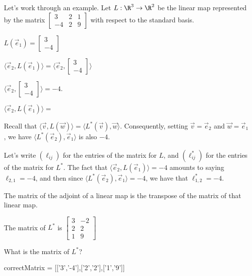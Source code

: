 \documentclass{ximera}
\begin{document}
\begin{question}
  Let's work through an example.  Let $L:\R^3 \to \R^2$ be the linear
  map represented by the matrix \(\begin{bmatrix} 3&2 &1\\
    -4&2&9\end{bmatrix}\) with respect to the standard basis.

  \begin{solution}
    \begin{hint}
      $L(\vec{e}_1) = \begin{bmatrix} 3 \\ -4 \end{bmatrix}$
    \end{hint}
    \begin{hint}
      $\langle \vec{e}_2, L(\vec{e}_1) \rangle = \langle \vec{e}_2, \begin{bmatrix} 3 \\ -4 \end{bmatrix} \rangle$
    \end{hint}
    \begin{hint}
      $\langle \vec{e}_2, \begin{bmatrix} 3 \\ -4 \end{bmatrix} \rangle = -4$.
    \end{hint}

    $\langle \vec{e}_2, L(\vec{e}_1) \rangle = $ 
  \end{solution}

  Recall that $\langle \vec{v}, L(\vec{w})\rangle = \langle  L^*(\vec{v}),\vec{w}\rangle$.  Consequently, setting $\vec{v} = \vec{e}_2$ and $\vec{w} = \vec{e}_1$, we have $\langle L^*(\vec{e}_2), \vec{e}_1 \rangle$ is also $-4$.

  Let's write $(\ell_{ij})$ for the entries of the matrix for $L$, and
  $(\ell^*_{ij})$ for the entries of the matrix for $L^*$.  The fact
  that $\langle \vec{e}_2, L(\vec{e}_1) \rangle = -4$ amounts to
  saying $\ell_{2,1} = -4$, and then since $\langle L^*(\vec{e}_2), \vec{e}_1 \rangle = -4$, we have that $\ell^*_{1,2} = -4$.

  \begin{solution}
    \begin{hint}
      The matrix of the adjoint of a linear map is the transpose of the matrix of that linear map.
    \end{hint}
    \begin{hint}
      The matrix of $L^*$ is \(\begin{bmatrix} 3&-2\\ 2&2\\1&9\end{bmatrix}\)
    \end{hint}
    What is the matrix of $L^*$?
    \begin{matrix-answer}
      correctMatrix = [['3','-4'],['2','2'],['1','9']]
    \end{matrix-answer}
  \end{solution}


\end{question}
\end{document}

